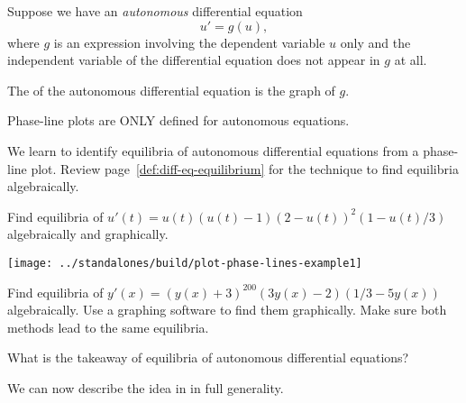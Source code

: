 \documentclass[../main.tex]{subfiles}
\begin{document}
\begin{definition}
  Suppose we have an \emph{autonomous} differential equation
  \[
    u' = g(u),
  \]
  where \(g\) is an expression involving the dependent variable \(u\) only and the independent variable of the differential equation does not appear in \(g\) at all.

  The  of the autonomous differential equation is the graph of \(g\).
\end{definition}

\faExclamationTriangle{} Phase-line plots are ONLY defined for autonomous equations.

We learn to identify equilibria of autonomous differential equations from a phase-line plot. Review page~\ref{def:diff-eq-equilibrium} for the technique to find equilibria algebraically.

\begin{example}
  Find equilibria of \(u'(t) = u(t)(u(t)-1)(2 - u(t))^{2}(1 - u(t)/3)\) algebraically and graphically.
  
  \texttt{[image: ../standalones/build/plot-phase-lines-example1]}
\end{example}

\begin{example}
  Find equilibria of \(y'(x) = (y(x) + 3)^{200} (3y(x) - 2) (1/3 - 5y(x))\) algebraically. Use a graphing software to find them graphically. Make sure both methods lead to the same equilibria.
\end{example}

\faPencil*{} What is the takeaway of equilibria of autonomous differential equations?

We can now describe the idea in \faStar{} in full generality.
\end{document}
